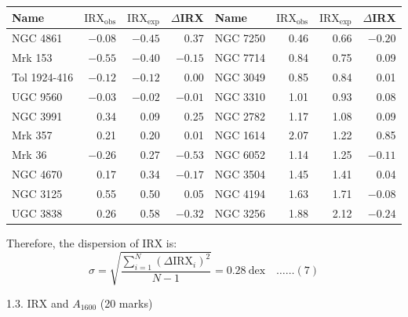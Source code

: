 \begin{description}
  \begin{center}
  \begin{tabular}{lrrr|lrrr}
    Name & $\mathrm{IRX}_{\mathrm{obs}}$ & $\mathrm{IRX}_{\mathrm{exp}}$ &
    $\Delta$IRX & Name & $\mathrm{IRX}_{\mathrm{obs}}$ &
    $\mathrm{IRX}_{\mathrm{exp}}$ & $\Delta$IRX \\
    \hline
    NGC 4861     & $-0.08$ & $-0.45$ & 0.37    & NGC 7250 & 0.46 & 0.66 & $-0.20$ \\
    Mrk 153      & $-0.55$ & $-0.40$ & $-0.15$ & NGC 7714 & 0.84 & 0.75 & 0.09 \\
    Tol 1924-416 & $-0.12$ & $-0.12$ & 0.00    & NGC 3049 & 0.85 & 0.84 & 0.01 \\
    UGC 9560     & $-0.03$ & $-0.02$ & $-0.01$ & NGC 3310 & 1.01 & 0.93 & 0.08 \\
    NGC 3991     & 0.34    & 0.09    & 0.25    & NGC 2782 & 1.17 & 1.08 & 0.09 \\
    Mrk 357      & 0.21    & 0.20    & 0.01    & NGC 1614 & 2.07 & 1.22 & 0.85 \\
    Mrk 36       & $-0.26$ & 0.27    & $-0.53$ & NGC 6052 & 1.14 & 1.25 & $-0.11$ \\
    NGC 4670     & 0.17    & 0.34    & $-0.17$ & NGC 3504 & 1.45 & 1.41 & 0.04 \\
    NGC 3125     & 0.55    & 0.50    & 0.05    & NGC 4194 & 1.63 & 1.71 & $-0.08$ \\
    UGC 3838     & 0.26    & 0.58    & $-0.32$ & NGC 3256 & 1.88 & 2.12 & $-0.24$ \\
  \end{tabular}
  \end{center}

  Therefore, the dispersion of IRX is:
  \[ \sigma = \sqrt{\frac{\sum_{i=1}^{N}(\Delta\mathrm{IRX}_i)^2}{N-1}}
     = 0.28\ \mathrm{dex} \quad\ldots\ldots(7) \]
\end{description}

1.3. IRX and $A_{1600}$ \hfill(20 marks)

